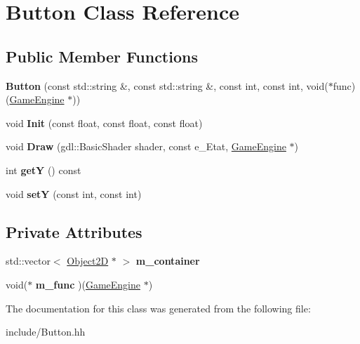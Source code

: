 \hypertarget{class_button}{}\section{Button Class Reference}
\label{class_button}
\subsection*{Public Member Functions}
\begin{DoxyCompactItemize}
\item 
\hypertarget{class_button_af4ab53da35b159adf57cb70ab78404f7}{}{\bfseries Button} (const std\+::string \&, const std\+::string \&, const int, const int, void($\ast$func)(\hyperlink{class_game_engine}{Game\+Engine} $\ast$))\label{class_button_af4ab53da35b159adf57cb70ab78404f7}

\item 
\hypertarget{class_button_addd49b4d907f0ddb329b04bcb453234a}{}void {\bfseries Init} (const float, const float, const float)\label{class_button_addd49b4d907f0ddb329b04bcb453234a}

\item 
\hypertarget{class_button_ab68e9415e63ef7510850952cb1f6c0b8}{}void {\bfseries Draw} (gdl\+::\+Basic\+Shader shader, const e\+\_\+\+Etat, \hyperlink{class_game_engine}{Game\+Engine} $\ast$)\label{class_button_ab68e9415e63ef7510850952cb1f6c0b8}

\item 
\hypertarget{class_button_a9b3c922ffd409bf8ab2674b1962f3224}{}int {\bfseries get\+Y} () const \label{class_button_a9b3c922ffd409bf8ab2674b1962f3224}

\item 
\hypertarget{class_button_a5a86d7b4fe30430509cd61ead75e19ee}{}void {\bfseries set\+Y} (const int, const int)\label{class_button_a5a86d7b4fe30430509cd61ead75e19ee}

\end{DoxyCompactItemize}
\subsection*{Private Attributes}
\begin{DoxyCompactItemize}
\item 
\hypertarget{class_button_a8658891f06862b0d62b15e229e75a2d5}{}std\+::vector$<$ \hyperlink{class_object2_d}{Object2\+D} $\ast$ $>$ {\bfseries m\+\_\+container}\label{class_button_a8658891f06862b0d62b15e229e75a2d5}

\item 
\hypertarget{class_button_aa1a7fa4a75f4ad72dbdc6930b2d47edd}{}void($\ast$ {\bfseries m\+\_\+func} )(\hyperlink{class_game_engine}{Game\+Engine} $\ast$)\label{class_button_aa1a7fa4a75f4ad72dbdc6930b2d47edd}

\end{DoxyCompactItemize}


The documentation for this class was generated from the following file\+:\begin{DoxyCompactItemize}
\item 
include/Button.\+hh\end{DoxyCompactItemize}
